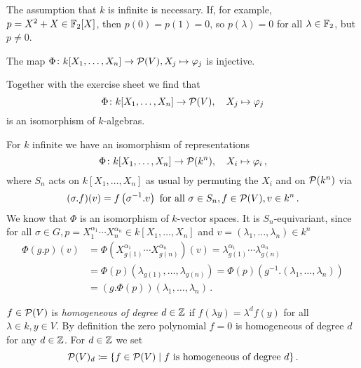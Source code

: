 \begin{warning}
  The assumption that $k$ is infinite is necessary.
  If, for example, $p = X^2 + X \in \mathbb{F}_2[X]$, then $p(0) = p(1) = 0$, so $p(\lambda) = 0$ for all $\lambda \in \mathbb{F}_2$, but $p \neq 0$.
\end{warning}


\begin{corollary}
  The map $\Phi \colon k[X_1, \dotsc, X_n] \to \mathcal{P}(V), X_j \mapsto \varphi_j$ is injective.
\end{corollary}


Together with the exercise sheet we find that
\[
          \Phi
  \colon  k[X_1, \dotsc, X_n]
  \to     \mathcal{P}(V),
  \quad   X_j
  \mapsto \varphi_j
\]
is an isomorphism of $k$-algebras.


\begin{remark}
  For $k$ infinite we have an isomorphism of representations
  \[
            \Phi
    \colon  k[X_1, \dotsc, X_n]
    \to     \mathcal{P}(k^n),
    \quad   X_i
    \mapsto \varphi_i \,,
  \]
  where $S_n$ acts on $k[X_1, \dotsc, X_n]$ as usual by permuting the $X_i$ and on $\mathcal{P}(k^n)$ via
  \[
      (\sigma.f)(v)
    = f\left( \sigma^{-1}.v \right)
    \text{ for all }
    \sigma \in S_n,
    f \in \mathcal{P}(V),
    v \in k^n \,.
  \]
  We know that $\Phi$ is an isomorphism of $k$-vector spaces.
  It is $S_n$-equivariant, since for all $\sigma \in G, p = X_1^{\alpha_1} \dotsm X_n^{\alpha_n} \in k[X_1, \dotsc, X_n]$ and $v = (\lambda_1, \dotsc, \lambda_n) \in k^n$
  \begin{align*}
       \Phi(g.p)(v)
    &= \Phi\left( X_{g(1)}^{\alpha_1} \dotsm X_{g(n)}^{\alpha_n} \right)(v)
     = \lambda_{g(1)}^{\alpha_1} \dotsm \lambda_{g(n)}^{\alpha_n} \\
    &= \Phi(p)( \lambda_{g(1)}, \dotsc, \lambda_{g(n)} )
     = \Phi(p)\left( g^{-1}.(\lambda_1, \dotsc, \lambda_n) \right) \\
    &= (g.\Phi(p))(\lambda_1, \dotsc, \lambda_n) \,.
  \end{align*}
\end{remark}


\begin{definition}
  $f \in \mathcal{P}(V)$ is \emph{homogeneous of degree $d \in \mathbb{Z}$} if $f(\lambda y) = \lambda^d f(y)$ for all $\lambda \in k, y \in V$.
  By definition the zero polynomial $f=0$ is homogeneous of degree $d$ for any $d \in \mathbb{Z}$.
  For $d \in \mathbb{Z}$ we set
  \[
              \mathcal{P}(V)_d
    \coloneqq \{
                f \in \mathcal{P}(V)
              \mid
                f \text{ is homogeneous of degree } d
              \} \,.
  \]
\end{definition}


